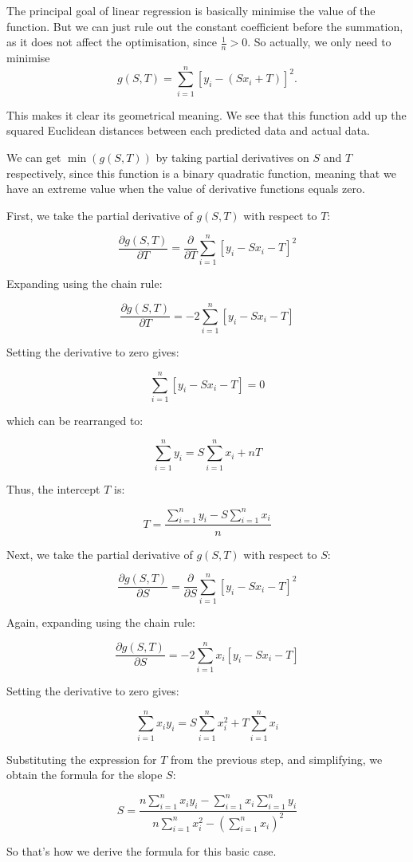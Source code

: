 \documentclass[12pt,a4paper]{article}
\begin{document}
\begin{solution}
\begin{remark}
The principal goal of linear regression is basically minimise the value of the function. But we can just rule out the constant coefficient before the summation, as it does not affect the optimisation, since $\frac{1}{n} > 0$. So actually, we only need to minimise 
\[
g(S, T) = \sum_{i=1}^n[y_i- (Sx_i + T)]^2.
\]

This makes it clear its geometrical meaning. We see that this function add up the squared Euclidean distances between each predicted data and actual data.

We can get $\min(g(S,T))$ by taking partial derivatives on $S$ and $T$ respectively, since this function is a binary quadratic function, meaning that we have an extreme value when the value of derivative functions equals zero.

First, we take the partial derivative of $g(S, T)$ with respect to $T$:

\[
\frac{\partial g(S, T)}{\partial T} = \frac{\partial}{\partial T} \sum_{i=1}^{n} \left[ y_i - Sx_i - T \right]^2
\]

Expanding using the chain rule:

\[
\frac{\partial g(S, T)}{\partial T} = -2 \sum_{i=1}^{n} \left[ y_i - Sx_i - T \right]
\]

Setting the derivative to zero gives:

\[
\sum_{i=1}^{n} \left[ y_i - Sx_i - T \right] = 0
\]

which can be rearranged to:

\[
\sum_{i=1}^{n} y_i = S \sum_{i=1}^{n} x_i + n T
\]

Thus, the intercept $T$ is:

\[
T = \frac{\sum_{i=1}^{n} y_i - S \sum_{i=1}^{n} x_i}{n}
\]

Next, we take the partial derivative of $g(S, T)$ with respect to $S$:

\[
\frac{\partial g(S, T)}{\partial S} = \frac{\partial}{\partial S} \sum_{i=1}^{n} \left[ y_i - Sx_i - T \right]^2
\]

Again, expanding using the chain rule:

\[
\frac{\partial g(S, T)}{\partial S} = -2 \sum_{i=1}^{n} x_i \left[ y_i - Sx_i - T \right]
\]

Setting the derivative to zero gives:

\[
\sum_{i=1}^{n} x_i y_i = S \sum_{i=1}^{n} x_i^2 + T \sum_{i=1}^{n} x_i
\]

Substituting the expression for $T$ from the previous step, and simplifying, we obtain the formula for the slope $S$:

\[
S = \frac{n \sum_{i=1}^{n} x_i y_i - \sum_{i=1}^{n} x_i \sum_{i=1}^{n} y_i}{n \sum_{i=1}^{n} x_i^2 - \left( \sum_{i=1}^{n} x_i \right)^2}
\]

So that's how we derive the formula for this basic case.

\end{remark}
\end{solution}

\printbibliography
\end{document}
